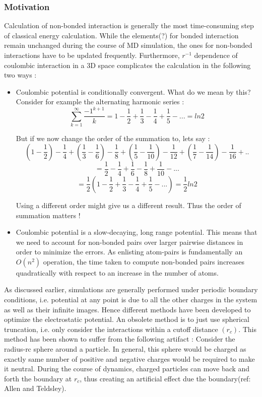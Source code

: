 \documentclass[9pt,bestpractices]{livecoms}
\begin{document}
\subsubsection{Motivation}

Calculation of non-bonded interaction is generally the most time-consuming step of classical energy calculation. While the elements(?) for bonded interaction remain unchanged during the course of MD simulation, the ones for non-bonded interactions have to be updated frequently. Furthermore, $r^{-1} $ dependence  of coulombic interaction in a 3D space complicates the calculation in the following two ways :
\begin{itemize}
\item Coulombic potential is conditionally convergent. What do we mean by this? Consider for example the alternating harmonic series : \\
\[
\sum_{k=1}^{\infty} \frac{-1^{k+1}}{k} = 1 - \frac{1}{2} + \frac{1}{3} - \frac{1}{4} + \frac{1}{5} - ... = ln 2 
\]

But if we now change the order of the summation to, lets say :
\[
( 1 - \frac{1}{2})  - \frac{1}{4} + (\frac{1}{3} - \frac{1}{6}) - \frac{1}{8} + (\frac{1}{5} - \frac{1}{10}) - \frac{1}{12} + (\frac{1}{7} - \frac{1}{14}) - \frac{1}{16} + .. 
\]
\[
= \frac{1}{2} - \frac{1}{4} + \frac{1}{6} - \frac{1}{8} + \frac{1}{10} - ... 
\]
\[
= \frac{1}{2} (1 - \frac{1}{2} + \frac{1}{3} - \frac{1}{4} + \frac{1}{5} - ...) = \frac{1}{2} ln 2
\]

Using a different order might give us a different result. Thus the order of summation matters !

\item Coulombic potential is a slow-decaying, long range potential. This means that we need to account for non-bonded pairs over larger pairwise distances in order to minimize the errors. As enlisting atom-pairs is fundamentally an $O(n^2) $ operation, the time taken to compute non-bonded pairs increases quadratically with respect to an increase in the number of atoms.   
\end{itemize} 

As discussed earlier, simulations are generally performed under periodic boundary conditions, i.e. potential at any point is due to all the other charges in the system as well as their infinite images. Hence different methods have been developed to optimize the electrostatic potential. An obsolete method is to just use spherical truncation, i.e. only consider the interactions within a cutoff distance $(r_c)$. This method has been shown to suffer from the following artifact : Consider the radius-rc sphere around a particle. In general, this sphere would be charged as exactly same number of positive and negative charges would be required to make it neutral. During the course of dynamics, charged particles can move back and forth the boundary at $r_c$, thus creating an artificial effect due the boundary(ref: Allen and Teldsley).  
\end{document}
